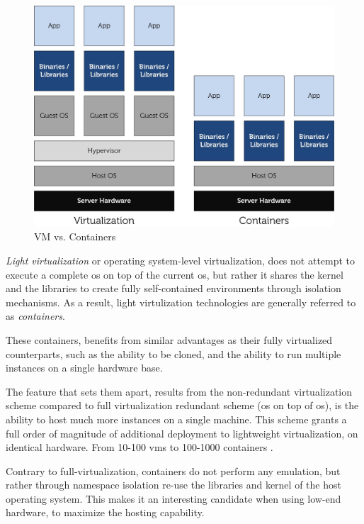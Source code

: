 \documentclass[12pt, titlepage]{uo_temp}
\begin{document}
     \begin{figure}[h]
       \includegraphics[width=125mm]{images/lxc_vm.jpg}
       \caption{VM vs. Containers\label{vm_containers}\cite{dell}}
     \end{figure}
     
     \emph{Light virtualization} or operating system-level virtualization, does not
     attempt to execute a complete \gls{os} on top of the current \gls{os}, but rather it
     shares the kernel and the libraries to create fully self-contained environments
     through isolation mechanisms. As a result, light virtulization technologies are
     generally referred to as \emph{containers}.
           
     These containers, benefits from similar advantages as their fully virtualized
     counterparts, such as the ability to be cloned, and the ability to run multiple
     instances on a single hardware base. 
     
     The feature that sets them apart, results from the non-redundant virtualization
     scheme compared to full virtualization redundant scheme (\gls{os} on top of
     \gls{os}), is the ability to host much more instances on a single machine. This
     scheme grants a full order of magnitude of additional deployment to lightweight
     virtualization, on identical hardware. From 10-100 \gls{vm}s to 100-1000 containers
     \cite{dell}.

     Contrary to full-virtualization, containers do not perform any
     emulation, but rather through namespace isolation re-use the libraries and kernel of
     the host operating system. This makes it an interesting candidate when using low-end
     hardware, to maximize the hosting capability. 
     
\end{document}
